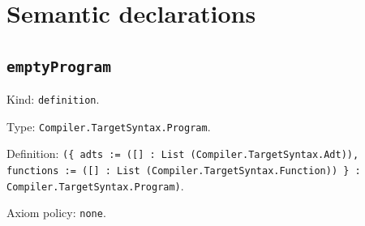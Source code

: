 \documentclass[11pt]{article}
\begin{document}
\section*{Semantic declarations}
\subsection*{\texttt{emptyProgram}}
\noindent Kind: \texttt{definition}.\par
\noindent Type: \texttt{Compiler.TargetSyntax.Program}.\par
\noindent Definition: \texttt{(\{ adts := ([] : List (Compiler.TargetSyntax.Adt)), functions := ([] : List (Compiler.TargetSyntax.Function)) \} : Compiler.TargetSyntax.Program)}.\par
\noindent Axiom policy: \texttt{none}.\par
\end{document}
